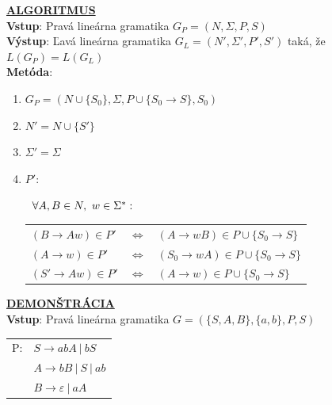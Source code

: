 \documentclass[11pt,a4paper]{article}
\begin{document}
\underline{\textbf{\large{ALGORITMUS}}}\\[0.3em]
\textbf{Vstup}: Pravá lineárna gramatika $G_P = (N,\Sigma,P,S)$\\
\textbf{Výstup}: Ľavá lineárna gramatika $G_L = (N',\Sigma',P',S')$ taká, že $L(G_P)=L(G_L)$\\
\textbf{Metóda}:\\[-2em]
\begin{center}
\begin{minipage}{0.9\textwidth}
\begin{enumerate}[1.)]
    \item $G_P = (N \cup \{S_0\},\Sigma,P \cup \{S_0 \rightarrow S\},S_0)$\\[-2em]
    \item $N' = N \cup \{S'\}$\\[-2em]
    \item $\Sigma' = \Sigma$\\[-2em]
    \item $P'$:\\[-3.275em]
    \begin{center}
    \begin{minipage}{0.85\textwidth}
            $\hspace{0.6em}\forall A,B \in N,\  w \in \Sigma^*:$\\
        \begin{tabular}{lcl}
            $(B  \rightarrow Aw) \in P'$ & $\Longleftrightarrow$ & $(A   \rightarrow wB) \in P \cup \{S_0 \rightarrow S\}$\\
            $(A  \rightarrow w ) \in P'$ & $\Longleftrightarrow$ & $(S_0 \rightarrow wA) \in P \cup \{S_0 \rightarrow S\}$\\
            $(S' \rightarrow Aw) \in P'$ & $\Longleftrightarrow$ & $(A   \rightarrow w ) \in P \cup \{S_0 \rightarrow S\}$\\
        \end{tabular}
    \end{minipage}
    \end{center}
\end{enumerate}
\end{minipage}
\end{center}

\hfill

\underline{\textbf{\large{DEMONŠTRÁCIA}}}\\[0.3em]
\textbf{Vstup}: Pravá lineárna gramatika $G = (\{S,A,B\}, \{a, b\}, P, S)$\\[-1.25em]
\begin{center}
\begin{tabular}{ll}
P:&$S \rightarrow abA\ |\ bS$\\
&$A \rightarrow bB\ |\ S\ |\ ab$\\
&$B \rightarrow \varepsilon\ |\ aA$\\
\end{tabular}
\end{center}
\end{document}
